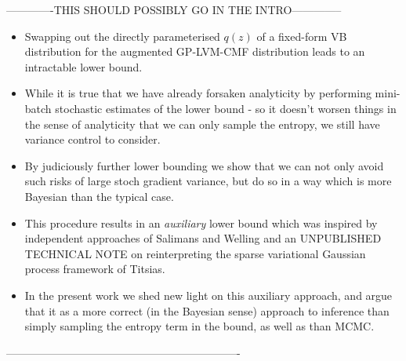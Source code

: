 \documentclass[]{article}
\begin{document}
-------------THIS SHOULD POSSIBLY GO IN THE INTRO--------------

\begin{itemize}
  \item Swapping out the directly parameterised $q(z)$ of a fixed-form VB distribution for the augmented GP-LVM-CMF distribution leads to an intractable lower bound.
  \item While it is true that we have already forsaken analyticity by performing mini-batch stochastic estimates of the lower bound - so it doesn't worsen things in the sense of analyticity that we can only sample the entropy, we still have variance control to consider.
  \item By judiciously further lower bounding we show that we can not only avoid such risks of large stoch gradient variance, but do so in a way which is more Bayesian than the typical case.
  \item This procedure results in an \emph{auxiliary} lower bound which was inspired by independent approaches of Salimans and Welling and an UNPUBLISHED TECHNICAL NOTE on reinterpreting the sparse variational Gaussian process framework of Titsias.
  \item In the present work we shed new light on this auxiliary approach, and argue that it as a more correct (in the Bayesian sense) approach to inference than simply sampling the entropy term in the bound, as well as than MCMC.
\end{itemize}

----------------------------------------------------------------
\end{document}

